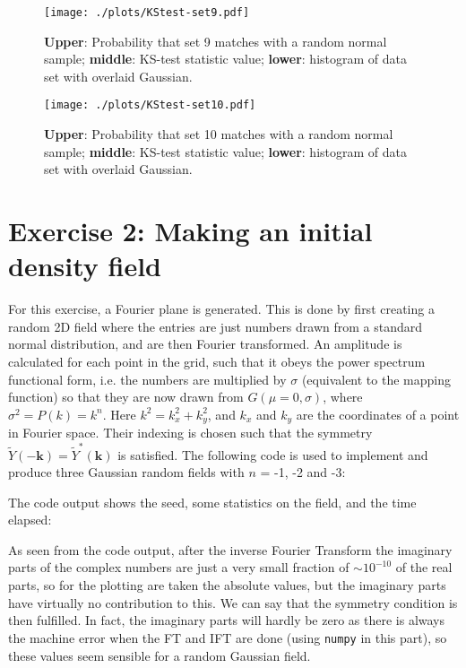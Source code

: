 \documentclass{article}
\begin{document}
\begin{figure}[!h]
\centering
\begin{minipage}[t]{7.6cm}
    \centering
    \texttt{[image: ./plots/KStest-set9.pdf]}
    \caption{\textbf{Upper}: Probability that set 9 matches with a random normal sample; \textbf{middle}: KS-test statistic value; \textbf{lower}: histogram of data set with overlaid Gaussian.}
    \label{fig:KS-9}
\end{minipage}%
\qquad
\begin{minipage}[t]{7.6cm}
    \centering
    \texttt{[image: ./plots/KStest-set10.pdf]}
    \caption{\textbf{Upper}: Probability that set 10 matches with a random normal sample; \textbf{middle}: KS-test statistic value; \textbf{lower}: histogram of data set with overlaid Gaussian. }
    \label{fig:KS-10}
\end{minipage}%
\end{figure}


\section{Exercise 2: Making an initial density field}
For this exercise, a Fourier plane is generated. This is done by first creating a random 2D field where the entries are just numbers drawn from a standard normal distribution, and are then Fourier transformed. An amplitude is calculated for each point in the grid, such that it obeys the power spectrum functional form, i.e. the numbers are multiplied by $\sigma$ (equivalent to the mapping function) so that they are now drawn from $G(\mu=0, \sigma)$, where $\sigma^2 = P(k) = k^n$. Here $k^2 = k_x^2+k_y^2$, and $k_x$ and $k_y$ are the coordinates of a point in Fourier space. Their indexing is chosen such that the symmetry $\widetilde{Y}(\mathbf{-k}) = \widetilde{Y}^*(\mathbf{k})$ is satisfied. The following code is used to implement and produce three Gaussian random fields with $n$ = -1, -2 and -3:


The code output shows the seed, some statistics on the field, and the time elapsed:


As seen from the code output, after the inverse Fourier Transform the imaginary parts of the complex numbers are just a very small fraction of $\sim 10^{-10}$ of the real parts, so for the plotting are taken the absolute values, but the imaginary parts have virtually no contribution to this. We can say that the symmetry condition is then fulfilled. In fact, the imaginary parts will hardly be zero as there is always the machine error when the FT and IFT are done (using \verb+numpy+ in this part), so these values seem sensible for a random Gaussian field.
\end{document}
